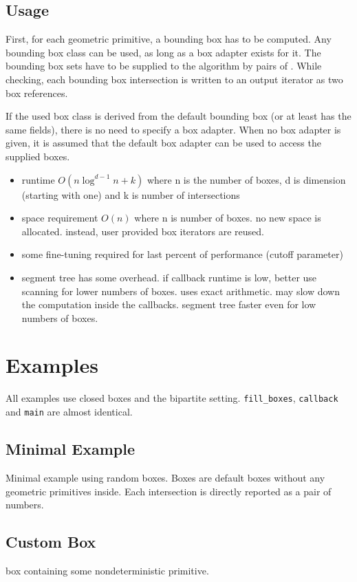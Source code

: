 \subsection*{Usage}
First, for each geometric primitive, a bounding box has to be computed. Any bounding box class can be used, as long as a box adapter exists for it. The bounding box sets have to be supplied to the algorithm by pairs of . While checking, each bounding box intersection is written to an output iterator as two box references.

If the used box class is derived from the default bounding box (or at least has the same fields), there is no need to specify a box adapter. When no box adapter is given, it is assumed that the default box adapter can be used to access the supplied boxes.


\begin{itemize}
  \item runtime $O(n\log^{d-1}n+k)$ where n is the number of boxes, d is dimension (starting with one) and k is number of intersections
  \item space requirement $O(n)$ where n is number of boxes. no new space is allocated. instead, user provided box iterators are reused.
  \item some fine-tuning required for last percent of performance (cutoff parameter) 
  \item segment tree has some overhead. if callback runtime is low, better use scanning for lower numbers of boxes. \cgal uses exact arithmetic. may slow down the computation inside the callbacks. segment tree faster even for low numbers of boxes.  
\end{itemize}

 
\section*{Examples}
All examples use closed boxes and the bipartite setting. \texttt{fill\_boxes}, \texttt{callback} and \texttt{main} are almost identical.
\subsection*{Minimal Example}
Minimal example using random boxes. Boxes are default boxes without any geometric primitives inside. Each intersection is directly reported as a pair of numbers. 

\subsection*{Custom Box}
box containing some nondeterministic primitive. 

